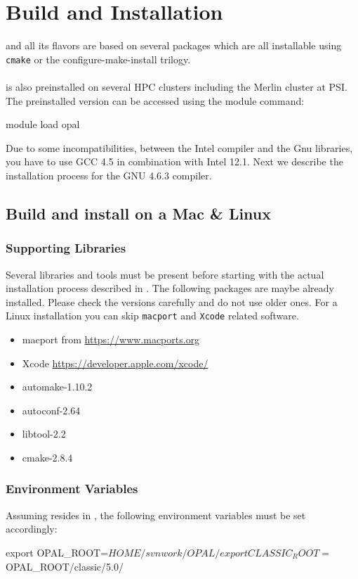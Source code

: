 

\chapter{Build and Installation}
\label{chp:installation}
\opal and all its flavors are based on several packages which are all installable using \texttt{cmake} or the configure-make-install trilogy. \\ \\
\opal is also preinstalled on several HPC clusters including the Merlin cluster at PSI. The preinstalled version can be accessed
using the module command:
\begin{footnotesize}
\begin{example}
module load opal
\end{example}
\end{footnotesize}
Due to some incompatibilities, between the Intel compiler and the Gnu libraries, you have to use GCC 4.5 in combination with Intel 12.1. Next we describe
the installation process for the GNU 4.6.3 compiler.
\section{Build and install \opal on a Mac \& Linux}
\subsection{Supporting Libraries}
Several libraries and tools must be present before starting with the actual \opal installation process described in .
The following packages are maybe already installed. Please check the versions carefully and do not use older ones. For a Linux installation
you can skip \texttt{macport} and \texttt{Xcode} related software.
\begin{itemize}
\item macport from \url{https://www.macports.org}
\item Xcode \url{https://developer.apple.com/xcode/}
\item automake-1.10.2
\item autoconf-2.64
\item libtool-2.2
\item cmake-2.8.4
\end {itemize}


\subsection{Environment Variables}
\label{ssec:envvar}
Assuming \opal resides in , the following
environment variables must be set accordingly:
\begin{footnotesize}
\begin{example}
export OPAL_ROOT=$HOME/svnwork/OPAL/
export CLASSIC_ROOT=$OPAL_ROOT/classic/5.0/
\end{example}
\end{footnotesize}


